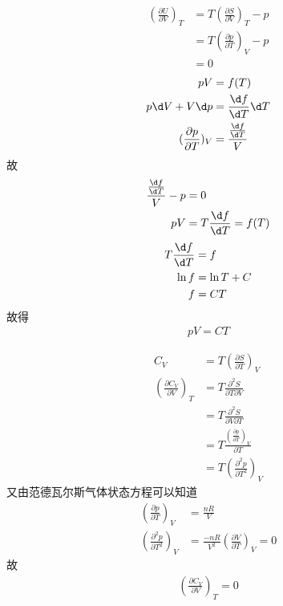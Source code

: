 \documentclass{phyasgn}
\begin{document}
\begin{sol}[6]
    \begin{align*}
        (\frac{\partial U}{\partial V})_T&=T(\frac{\partial S}{\partial V})_T-p\\
        &=T(\frac{\partial p}{\partial T})_V-p\\
        &=0
    \end{align*}
    \begin{align*}
        pV&=f(T)\\
        p\d V+V\d p&=\frac{\d f}{\d T}\d T\\
        (\frac{\partial p}{\partial T})_V&=\frac{\frac{\d f}{\d T}}{V}
    \end{align*}
    故
    \begin{align*}
        \frac{\frac{\d f}{\d T}}{V}-p&=0\\
        pV&=T\frac{\d f}{\d T}=f(T)
    \end{align*}
    \begin{align*}
        T\frac{\d f}{\d T}&=f\\
        \ln f&=\ln T+C\\
        f&=CT\\
    \end{align*}
    故得
    \begin{align*}
        pV=CT
    \end{align*}
\end{sol}\par

\begin{sol}[7]
    \begin{align*}
        C_V&=T(\frac{\partial S}{\partial T})_V\\
        (\frac{\partial C_V}{\partial V})_T&=T\frac{\partial^2 S}{\partial T\partial V}\\
        &=T\frac{\partial^2 S}{\partial V\partial T}\\
        &=T\frac{(\frac{\partial p}{\partial T})_V}{\partial T}\\
        &=T(\frac{\partial^2 p}{\partial T^2})_V
    \end{align*}
    又由范德瓦尔斯气体状态方程可以知道
    \begin{align*}
        (\frac{\partial p}{\partial T})_V&=\frac{nR}{V}\\
        (\frac{\partial^2 p}{\partial T^2})_V&=\frac{-nR}{V^2}(\frac{\partial V}{\partial T})_V=0
    \end{align*}
    故
    \begin{align*}
        (\frac{\partial C_V}{\partial V})_T=0
    \end{align*}
\end{sol}\par
\end{document}
